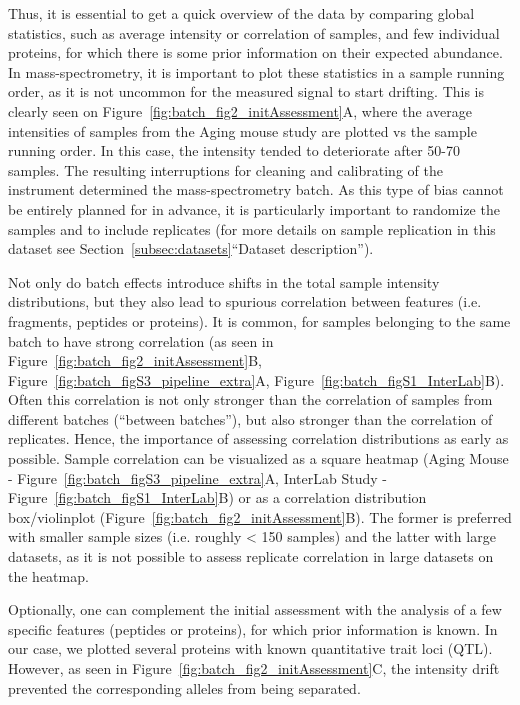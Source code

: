 \documentclass[num-refs]{wiley-article}
\begin{document}
Thus, it is essential to get a quick overview of the data by comparing global statistics, such as average intensity or correlation of samples, and few individual proteins, for which there is some prior information on their expected abundance. In mass-spectrometry, it is important to plot these statistics in a sample running order, as it is not uncommon for the measured signal to start drifting. This is clearly seen on Figure~\ref{fig:batch_fig2_initAssessment}A, where the average intensities of samples from the Aging mouse study are plotted vs the sample running order. In this case, the intensity tended to deteriorate after 50-70 samples. The resulting interruptions for cleaning and calibrating of the instrument determined the mass-spectrometry batch. As this type of bias cannot be entirely planned for in advance, it is particularly important to randomize the samples and to include replicates (for more details on sample replication in this dataset see Section~\ref{subsec:datasets}“Dataset description”). 

Not only do batch effects introduce shifts in the total sample intensity distributions, but they also lead to spurious correlation between features (i.e. fragments, peptides or proteins). It is common, for samples belonging to the same batch to have strong correlation (as seen in Figure~\ref{fig:batch_fig2_initAssessment}B, Figure~\ref{fig:batch_figS3_pipeline_extra}A, Figure~\ref{fig:batch_figS1_InterLab}B). Often this correlation is not only stronger than the correlation of samples from different batches (“between batches”), but also stronger than the correlation of replicates. Hence, the importance of assessing correlation distributions as early as possible. Sample correlation can be visualized as a square heatmap (Aging Mouse - Figure~\ref{fig:batch_figS3_pipeline_extra}A, InterLab Study -  Figure~\ref{fig:batch_figS1_InterLab}B) or as a correlation distribution box/violinplot (Figure~\ref{fig:batch_fig2_initAssessment}B). The former is preferred with smaller sample sizes (i.e. roughly < 150 samples) and the latter with large datasets, as it is not possible to assess replicate correlation in large datasets on the heatmap.

Optionally, one can complement the initial assessment with the analysis of a few specific features (peptides or proteins), for which prior information is known. In our case, we plotted several proteins with known quantitative trait loci (QTL). However, as seen in Figure~\ref{fig:batch_fig2_initAssessment}C, the intensity drift prevented the corresponding alleles from being separated.
\end{document}
